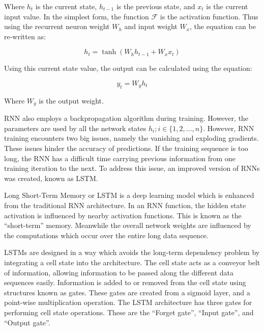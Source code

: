Where $h_{t}$ is the current state, $h_{t-1}$ is the previous state, and $x_{t}$ is the current input value. In the simplest form, the function $\mathcal{F}$ is the activation function. Thus using the recurrent neuron weight $W_{h}$ and input weight $W_{x}$, the equation can be re-written as:

\begin{equation}
    h_{t} = \tanh(W_{h}h_{t-1} + W_{x}x_{t})
\end{equation}

Using this current state value, the output can be calculated using the equation:

\begin{equation}
    y_{t} = W_{y}h_{t}
\end{equation}

Where $W_{y}$ is the output weight.\par

RNN also employs a backpropagation algorithm during training. However, the parameters are used by all the network states $h_{i}; i \in \{1, 2, ... , n\}$. However, RNN training encounters two big issues, namely the vanishing and exploding gradients. These issues hinder the accuracy of predictions. If the training sequence is too long, the RNN has a difficult time carrying previous information from one training iteration to the next. To address this issue, an improved version of RNNs was created, known as LSTM.\par

Long Short-Term Memory or LSTM is a deep learning model which is enhanced from the traditional RNN architecture. In an RNN function, the hidden state activation is influenced by nearby activation functions. This is known as the ``short-term'' memory. Meanwhile the overall network weights are influenced by the computations which occur over the entire long data sequence.\par


LSTMs are designed in a way which avoids the long-term dependency problem by integrating a cell state into the architecture. The cell state acts as a conveyor belt of information, allowing information to be passed along the different data sequences easily. Information is added to or removed from the cell state using structures known as gates. These gates are created from a sigmoid layer, and a point-wise multiplication operation. The LSTM architecture has three gates for performing cell state operations. These are the ``Forget gate'', ``Input gate'', and ``Output gate''.\par

